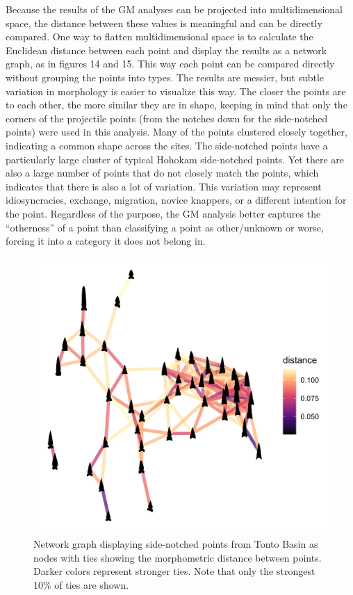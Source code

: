 \documentclass[a4paper]{article}
\begin{document}
Because the results of the GM analyses can be projected into multidimensional space, the distance between these values is meaningful and can be directly compared. One way to flatten multidimensional space is to calculate the Euclidean distance between each point and display the results as a network graph, as in figures 14 and 15. This way each point can be compared directly without grouping the points into types. The results are messier, but subtle variation in morphology is easier to visualize this way. The closer the points are to each other, the more similar they are in shape, keeping in mind that only the corners of the projectile points (from the notches down for the side-notched points) were used in this analysis. Many of the points clustered closely together, indicating a common shape across the sites. The side-notched points have a particularly large cluster of typical Hohokam side-notched points. Yet there are also a large number of points that do not closely match the points, which indicates that there is also a lot of variation. This variation may represent idiosyncracies, exchange, migration, novice knappers, or a different intention for the point. Regardless of the purpose, the GM analysis better captures the ``otherness'' of a point than classifying a point as other/unknown or worse, forcing it into a category it does not belong in.

\begin{figure}
\includegraphics[width=1\linewidth]{figures/TontoSideDistanceNetwork} \caption{Network graph displaying side-notched points from Tonto Basin as nodes with ties showing the morphometric distance between points. Darker colors represent stronger ties. Note that only the strongest 10\% of ties are shown.}\label{fig:TontoSideDistanceNetwork}
\end{figure}
\end{document}
